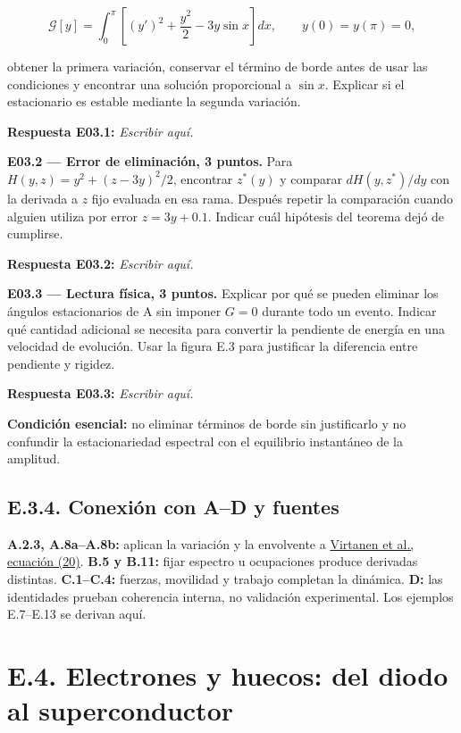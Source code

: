 \documentclass[
  spanish,
  10pt,
  a4paper,
]{article}
\begin{document}
\[
\mathcal G[y]=\int_0^\pi\left[(y')^2+\frac{y^2}{2}-3y\sin x\right]dx,
\qquad y(0)=y(\pi)=0,
\tag{E.13}
\]

obtener la primera variación, conservar el término de borde antes de
usar las condiciones y encontrar una solución proporcional a \(\sin x\).
Explicar si el estacionario es estable mediante la segunda variación.

\textbf{Respuesta E03.1:} \emph{Escribir aquí.}

\textbf{E03.2 --- Error de eliminación, 3 puntos.} Para
\(H(y,z)=y^2+(z-3y)^2/2\), encontrar \(z^*(y)\) y comparar
\(dH(y,z^*)/dy\) con la derivada a \(z\) fijo evaluada en esa rama.
Después repetir la comparación cuando alguien utiliza por error
\(z=3y+0.1\). Indicar cuál hipótesis del teorema dejó de cumplirse.

\textbf{Respuesta E03.2:} \emph{Escribir aquí.}

\textbf{E03.3 --- Lectura física, 3 puntos.} Explicar por qué se pueden
eliminar los ángulos estacionarios de A sin imponer \(G=0\) durante todo
un evento. Indicar qué cantidad adicional se necesita para convertir la
pendiente de energía en una velocidad de evolución. Usar la figura E.3
para justificar la diferencia entre pendiente y rigidez.

\textbf{Respuesta E03.3:} \emph{Escribir aquí.}

\textbf{Condición esencial:} no eliminar términos de borde sin
justificarlo y no confundir la estacionariedad espectral con el
equilibrio instantáneo de la amplitud.

\subsection{E.3.4. Conexión con A--D y
fuentes}\label{e.3.4.-conexiuxf3n-con-ad-y-fuentes}

\textbf{A.2.3, A.8a--A.8b:} aplican la variación y la envolvente a
\href{https://arxiv.org/pdf/1909.00992v1}{Virtanen et al., ecuación
(20)}. \textbf{B.5 y B.11:} fijar espectro u ocupaciones produce
derivadas distintas. \textbf{C.1--C.4:} fuerzas, movilidad y trabajo
completan la dinámica. \textbf{D:} las identidades prueban coherencia
interna, no validación experimental. Los ejemplos E.7--E.13 se derivan
aquí.

\newpage

\section{E.4. Electrones y huecos: del diodo al
superconductor}\label{e.4.-electrones-y-huecos-del-diodo-al-superconductor}
\end{document}
